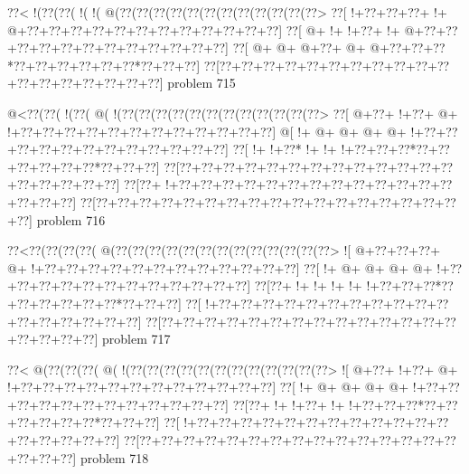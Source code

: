 \vbox{\vbox{\goo
\0??<\- !(\0??(\0??(\- !(\- !(\- @(\0??(\0??(\0??(\0??(\0??(\0??(\0??(\0??(\0??(\0??(\0??(\0??>
\0??[\- !+\0??+\0??+\0??+\- !+\- @+\0??+\0??+\0??+\0??+\0??+\0??+\0??+\0??+\0??+\0??+\0??+\0??]
\0??[\- @+\- !+\- !+\0??+\- !+\- @+\0??+\0??+\0??+\0??+\0??+\0??+\0??+\0??+\0??+\0??+\0??+\0??]
\0??[\- @+\- @+\- @+\0??+\- @+\- @+\0??+\0??+\0??*\0??+\0??+\0??+\0??+\0??+\0??*\0??+\0??+\0??]
\0??[\0??+\0??+\0??+\0??+\0??+\0??+\0??+\0??+\0??+\0??+\0??+\0??+\0??+\0??+\0??+\0??+\0??+\0??]
}
\hfil problem 715\hfil\break
}



\vbox{\vbox{\goo
\- @<\0??(\0??(\- !(\0??(\- @(\- !(\0??(\0??(\0??(\0??(\0??(\0??(\0??(\0??(\0??(\0??(\0??(\0??>
\0??[\- @+\0??+\- !+\0??+\- @+\- !+\0??+\0??+\0??+\0??+\0??+\0??+\0??+\0??+\0??+\0??+\0??+\0??]
\- @[\- !+\- @+\- @+\- @+\- @+\- !+\0??+\0??+\0??+\0??+\0??+\0??+\0??+\0??+\0??+\0??+\0??+\0??]
\0??[\- !+\- !+\0??*\- !+\- !+\- !+\0??+\0??+\0??*\0??+\0??+\0??+\0??+\0??+\0??*\0??+\0??+\0??]
\0??[\0??+\0??+\0??+\0??+\0??+\0??+\0??+\0??+\0??+\0??+\0??+\0??+\0??+\0??+\0??+\0??+\0??+\0??]
\0??[\0??+\- !+\0??+\0??+\0??+\0??+\0??+\0??+\0??+\0??+\0??+\0??+\0??+\0??+\0??+\0??+\0??+\0??]
\0??[\0??+\0??+\0??+\0??+\0??+\0??+\0??+\0??+\0??+\0??+\0??+\0??+\0??+\0??+\0??+\0??+\0??+\0??]
}
\hfil problem 716\hfil\break
}



\vbox{\vbox{\goo
\0??<\0??(\0??(\0??(\0??(\- @(\0??(\0??(\0??(\0??(\0??(\0??(\0??(\0??(\0??(\0??(\0??(\0??(\0??>
\- ![\- @+\0??+\0??+\0??+\- @+\- !+\0??+\0??+\0??+\0??+\0??+\0??+\0??+\0??+\0??+\0??+\0??+\0??]
\0??[\- !+\- @+\- @+\- @+\- @+\- !+\0??+\0??+\0??+\0??+\0??+\0??+\0??+\0??+\0??+\0??+\0??+\0??]
\0??[\0??+\- !+\- !+\- !+\- !+\- !+\0??+\0??+\0??*\0??+\0??+\0??+\0??+\0??+\0??*\0??+\0??+\0??]
\0??[\- !+\0??+\0??+\0??+\0??+\0??+\0??+\0??+\0??+\0??+\0??+\0??+\0??+\0??+\0??+\0??+\0??+\0??]
\0??[\0??+\0??+\0??+\0??+\0??+\0??+\0??+\0??+\0??+\0??+\0??+\0??+\0??+\0??+\0??+\0??+\0??+\0??]
}
\hfil problem 717\hfil\break
}



\vbox{\vbox{\goo
\0??<\- @(\0??(\0??(\0??(\- @(\- !(\0??(\0??(\0??(\0??(\0??(\0??(\0??(\0??(\0??(\0??(\0??(\0??>
\- ![\- @+\0??+\- !+\0??+\- @+\- !+\0??+\0??+\0??+\0??+\0??+\0??+\0??+\0??+\0??+\0??+\0??+\0??]
\0??[\- !+\- @+\- @+\- @+\- @+\- !+\0??+\0??+\0??+\0??+\0??+\0??+\0??+\0??+\0??+\0??+\0??+\0??]
\0??[\0??+\- !+\- !+\0??+\- !+\- !+\0??+\0??+\0??*\0??+\0??+\0??+\0??+\0??+\0??*\0??+\0??+\0??]
\0??[\- !+\0??+\0??+\0??+\0??+\0??+\0??+\0??+\0??+\0??+\0??+\0??+\0??+\0??+\0??+\0??+\0??+\0??]
\0??[\0??+\0??+\0??+\0??+\0??+\0??+\0??+\0??+\0??+\0??+\0??+\0??+\0??+\0??+\0??+\0??+\0??+\0??]
}
\hfil problem 718\hfil\break
}



